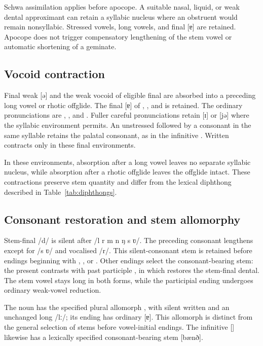 Schwa assimilation applies before apocope. A suitable nasal, liquid, or weak dental approximant can retain a syllabic nucleus where an obstruent would remain nonsyllabic. Stressed vowels, long vowels, and final [ɐ] are retained. Apocope does not trigger compensatory lengthening of the stem vowel or automatic shortening of a geminate.

\subsection{Vocoid contraction}
\label{sec:vocoid-contraction}

Final weak [ə] and the weak vocoid of eligible final  are absorbed into a preceding long vowel or rhotic offglide. The final [ɐ] of , , and  is retained. The ordinary pronunciations are , , and . Fuller careful pronunciations retain [ɪ] or [jə] where the syllabic environment permits. An unstressed  followed by a consonant in the same syllable retains the palatal consonant, as in the infinitive . Written  contracts only in these final environments.

In these environments, absorption after a long vowel leaves no separate syllabic nucleus, while absorption after a rhotic offglide leaves the offglide intact. These contractions preserve stem quantity and differ from the lexical diphthong described in Table~\ref{tab:diphthongs}.

\subsection{Consonant restoration and stem allomorphy}
\label{sec:consonant-restoration}

Stem-final /d/ is silent after /l r m n ŋ s ʋ/. The preceding consonant lengthens except for /s ʋ/ and vocalised /r/. This silent-consonant stem is retained before endings beginning with , , or . Other endings select the consonant-bearing stem: the present  contrasts with past participle , in which  restores the stem-final dental. The stem vowel stays long in both forms, while the participial ending undergoes ordinary weak-vowel reduction.

The noun  has the specified plural allomorph , with silent written  and an unchanged long /lː/; its ending has ordinary [ɐ]. This allomorph is distinct from the general selection of stems before vowel-initial endings. The infinitive  [] likewise has a lexically specified consonant-bearing stem [bænð].

